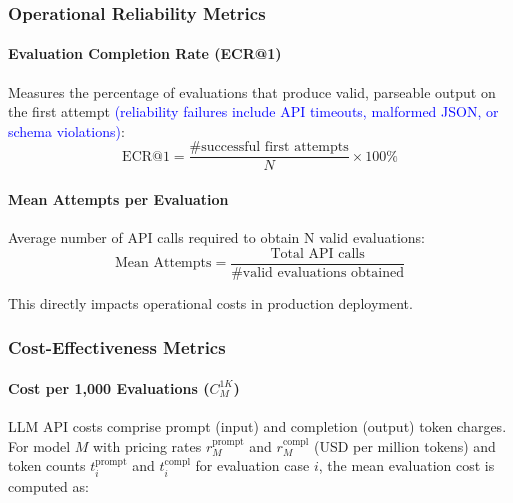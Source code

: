 \documentclass[letterpaper]{article} %
\newcommand{\add}[1]{\textcolor{blue}{#1}}
\newcommand{\add}[1]{#1}
\begin{document}
\subsubsection{Operational Reliability Metrics}

\paragraph{Evaluation Completion Rate (ECR@1)}
Measures the percentage of evaluations that produce valid, parseable output on the first attempt \add{(reliability failures include API timeouts, malformed JSON, or schema violations)}:
\begin{equation}
\text{ECR@1} = \frac{\text{\# successful first attempts}}{N} \times 100\%
\end{equation}


\paragraph{Mean Attempts per Evaluation}
Average number of API calls required to obtain N valid evaluations:
\begin{equation}
\text{Mean Attempts} = \frac{\text{Total API calls}}{\text{\# valid evaluations obtained}}
\end{equation}

This directly impacts operational costs in production deployment.

\subsubsection{Cost-Effectiveness Metrics}

\paragraph{Cost per 1,000 Evaluations ($C_M^{1K}$)}
LLM API costs comprise prompt (input) and completion (output) token charges. For model $M$ with pricing rates $r_M^{\text{prompt}}$ and $r_M^{\text{compl}}$ (USD per million tokens) and token counts $t_i^{\text{prompt}}$ and $t_i^{\text{compl}}$ for evaluation case $i$, the mean evaluation cost is computed as:
\end{document}

